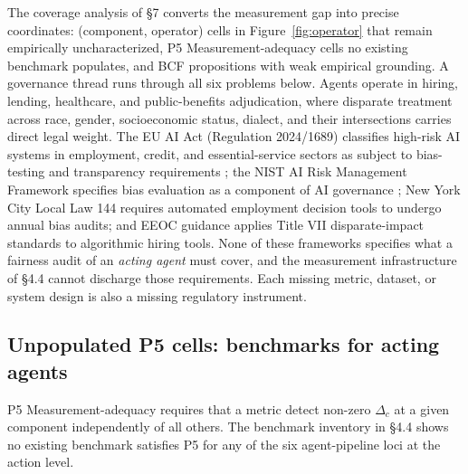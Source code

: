 \documentclass[acmsmall,nonacm]{acmart}
\begin{document}
The coverage analysis of \S{}7 converts the measurement gap into precise coordinates: (component, operator) cells in Figure~\ref{fig:operator} that remain empirically uncharacterized, P5 Measurement-adequacy cells no existing benchmark populates, and BCF propositions with weak empirical grounding. A governance thread runs through all six problems below. Agents operate in hiring, lending, healthcare, and public-benefits adjudication, where disparate treatment across race, gender, socioeconomic status, dialect, and their intersections carries direct legal weight. The EU AI Act (Regulation 2024/1689) classifies high-risk AI systems in employment, credit, and essential-service sectors as subject to bias-testing and transparency requirements \cite{parliament2024regulation}; the NIST AI Risk Management Framework specifies bias evaluation as a component of AI governance \cite{nist2023artificial}; New York City Local Law 144 requires automated employment decision tools to undergo annual bias audits; and EEOC guidance applies Title VII disparate-impact standards to algorithmic hiring tools. None of these frameworks specifies what a fairness audit of an \emph{acting agent} must cover, and the measurement infrastructure of \S{}4.4 cannot discharge those requirements. Each missing metric, dataset, or system design is also a missing regulatory instrument.

\subsection{Unpopulated P5 cells: benchmarks for acting agents}

P5 Measurement-adequacy requires that a metric detect non-zero $\Delta_c$ at a given component independently of all others. The benchmark inventory in \S{}4.4 shows no existing benchmark satisfies P5 for any of the six agent-pipeline loci at the action level.
\end{document}
